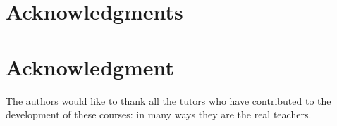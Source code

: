 \documentclass[conference,compsoc]{IEEEtran}
\begin{document}
%





\ifCLASSOPTIONcompsoc
  \section*{Acknowledgments}
\else
  \section*{Acknowledgment}
\fi


The authors would like to thank all the tutors who have contributed to
the development of these courses: in many ways they are the real teachers.
\end{document}
